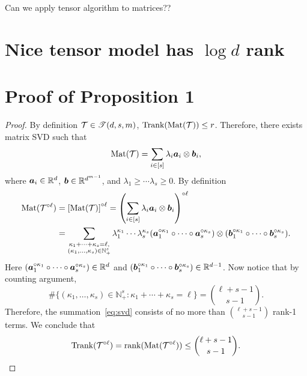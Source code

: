 \documentclass[final,12pt]{colt2020} %
\def\rank{\textup{Trank}}
\def\Mat{\textup{Mat}}
\def\caliT{\large\mathscr{T}}
\begin{document}
Can we apply tensor algorithm to matrices??
\section{Nice tensor model has $\log d$ rank}




\appendix
\section{Proof of Proposition 1}
\begin{proof}
By definition $\tT\in\caliT(d,s,m)$, $\rank(\Mat(\tT))\leq r$. Therefore, there exists matrix SVD such that
\[
\Mat(\tT)=\sum_{i\in[s]} \lambda_i\ma_i\otimes \mb_i,
\]
where $\bm{a}_i\in\mathbb{R}^d$, $\bm{b}\in\mathbb{R}^{d^{m-1}}$, and $\lambda_1\geq \cdots \lambda_s\geq 0$. By definition
\begin{align}\label{eq:svd}
\Mat(\tT^{\circ \ell})&=\left[\Mat(\tT)\right]^{\circ \ell}=\left(\sum_{i\in[s]}\lambda_i\ma_i\otimes \mb_i\right)^{\circ \ell}\\
&=\sum_{\substack{\kappa_1+\cdots+\kappa_s=\ell,\\ (\kappa_1,\ldots,\kappa_s)\in\mathbb{N}^s_{+}}}\lambda^{\kappa_1}_1\cdots\lambda^{\kappa_s}_s(\ma^{\circ \kappa_1}_1\circ \cdots \circ \ma^{\circ \kappa_s}_s)\otimes(\mb^{\circ \kappa_1}_1\circ \cdots \circ \mb^{\circ \kappa_s}_s).
\end{align}
Here $(\bm{a}^{\circ \kappa_1}_1\circ \cdots \circ \bm{a}^{\circ \kappa_s}_s) \in\mathbb{R}^{d}$ and $(\bm{b}^{\circ \kappa_1}_1\circ \cdots \circ \bm{b}^{\circ \kappa_s}_s)\in\mathbb{R}^{d-1}$. Now notice that by counting argument, 
\[
\#\{(\kappa_1,\ldots,\kappa_s) \in \mathbb{N}_{+}^{s} \colon \kappa_1+\cdots+\kappa_s=\ell\} = {\ell+s-1 \choose s-1}.
\]
Therefore, the summation~\eqref{eq:svd} consists of no more than ${\ell+s-1 \choose s-1}$ rank-1 terms. We conclude that
\[
\rank(\tT^{\circ \ell})=\text{rank}(\Mat(\tT^{\circ \ell}))\leq  {\ell+s-1 \choose s-1}.
\]
\end{proof}
\end{document}
